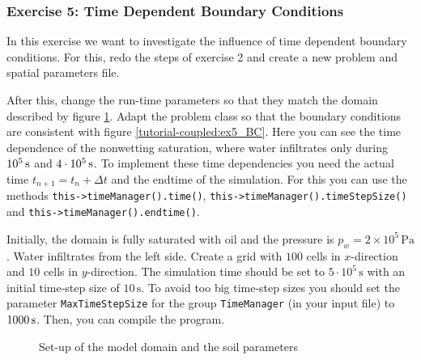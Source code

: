 \subsubsection{Exercise 5: Time Dependent Boundary Conditions}

In this exercise we want to investigate the influence of time dependent boundary conditions. For this, redo the steps of exercise 2 and create a new problem and spatial parameters file. 

After this, change the run-time parameters so that they match the
domain described by figure \ref{tutorial-coupled:ex5_Domain}. Adapt
the problem class so that the boundary conditions are consistent with
figure \ref{tutorial-coupled:ex5_BC}. Here you can see the time dependence of the nonwetting saturation, where water infiltrates only during $\unit[10^5]{s}$ and $\unit[4 \cdot 10^5]{s}$. To implement these time dependencies you need the actual time $t_{n+1}=t_n + \Delta t$ and the endtime of the simulation. For this you can use the methods \texttt{this->timeManager().time()}, \texttt{this->timeManager().timeStepSize()} and \texttt{this->timeManager().endtime()}. 

Initially, the domain is fully saturated with oil and the pressure is $p_w = 2 \times
10^5\,\text{Pa}$.  Water infiltrates from the left side. Create a grid
with $100$ cells in $x$-direction and $10$ cells in $y$-direction. The
simulation time should be set to $5 \cdot 10^5\,\text{s}$ with an
initial time-step size of $10\,\text{s}$. To avoid too big time-step sizes you should set the parameter \texttt{MaxTimeStepSize} for the group \texttt{TimeManager} (in your input file) to $\unit[1000]{s}$.  Then, you can compile the program.

\begin{figure}[ht]
\centering
{}
\caption{Set-up of the model domain and the soil parameters}\label{tutorial-coupled:ex5_Domain}
\end{figure}

